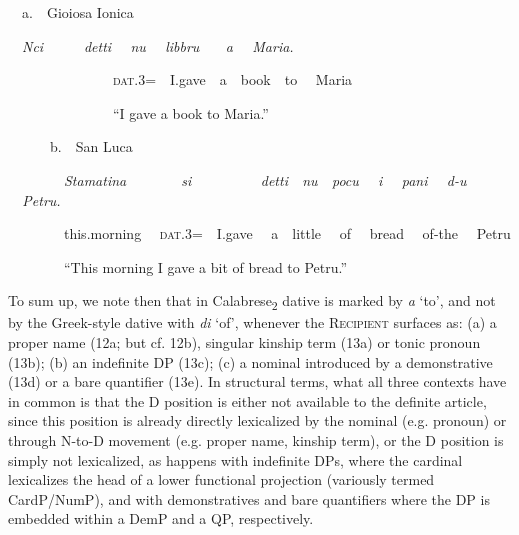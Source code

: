 \documentclass[output=paper,modfonts,nonflat]{langsci/langscibook}
\begin{document}
\begin{listWWNumviiileveli}
\item 
\begin{styleListParagraph}
\ \ a.\ \ Gioiosa Ionica
\end{styleListParagraph}
\end{listWWNumviiileveli}
\begin{styleListParagraph}
\ \ \textit{Nci \ \ \ \ \ detti \ \ nu \ \ libbru \ \ \ a \ \ Maria. \ \ }
\end{styleListParagraph}

\begin{styleStandard}
\ \ \ \ \ \ \ \ \ \ \ \ \ \ \ \textsc{dat}.3=\ \ I.gave\ \ a\ \ book\ \ to \ \ Maria
\end{styleStandard}

\begin{styleStandard}
\ \ \ \ \ \ \ \ \ \ \ \ \ \ \ “I gave a book to Maria.”
\end{styleStandard}

\begin{styleStandard}
\ \ \ \ \ \ b.\ \ San Luca
\end{styleStandard}

\begin{styleStandard}
\ \ \ \ \ \ \ \ \textit{Stamatina \ \ \ \ \ \ \ si \ \ \ \ \ \ \ \ \ detti\ \ nu\ \ pocu \ \ i \ \ pani \ \ d-u \ \ Petru.\ \ }
\end{styleStandard}

\begin{styleStandard}
\ \ \ \ \ \ \ \ this.morning \ \ \textsc{dat}.3=\ \ I.gave \ \ a\ \ little \ \ of \ \ bread \ \ of-the \ \ Petru
\end{styleStandard}

\begin{styleStandard}
\ \ \ \ \ \ \ \ “This morning I gave a bit of bread to Petru.”
\end{styleStandard}

\begin{styleStandard}
To sum up, we note then that in Calabrese\textsubscript{2} dative is marked by \textit{a }‘to’, and not by the Greek-style dative with \textit{di }‘of’, whenever the \textsc{Recipient} surfaces as: (a) a proper name (12a; but cf. 12b), singular kinship term (13a) or tonic pronoun (13b); (b) an indefinite DP (13c); (c) a nominal introduced by a demonstrative (13d) or a bare quantifier (13e). In structural terms, what all three contexts have in common is that the D position is either not available to the definite article, since this position is already directly lexicalized by the nominal (e.g. pronoun) or through N-to-D movement (e.g. proper name, kinship term), or the D position is simply not lexicalized, as happens with indefinite DPs, where the cardinal lexicalizes the head of a lower functional projection (variously termed CardP/NumP), and with demonstratives and bare quantifiers where the DP is embedded within a DemP and a QP, respectively. 
\end{styleStandard}
\end{document}
